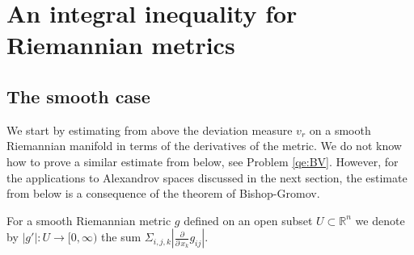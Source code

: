 \documentclass[12pt,leqno,intlimits]{amsart}
\numberwithin{equation}{section}
\newtheorem{prop}[thm]{PROPOSITION}
\theoremstyle{definition}
\newtheorem{defn}[thm]{Definition}%
\theoremstyle{remark}
\newcommand{\R}{\mathbb{R}}
\def\:{\colon}
\begin{document}






\section{An integral inequality for Riemannian metrics}\label{sec-BV-estimate}
\subsection{The smooth case} We start by estimating from above the deviation measure $v_r$  on a smooth Riemannian manifold in terms of the
derivatives of the metric.  We do not know how to prove a similar estimate from below, see  Problem \ref{qe:BV}. However, for the applications
to Alexandrov spaces discussed in the next section, the  estimate from below is a consequence of the theorem of Bishop-Gromov.

For a smooth Riemannian metric $g$ defined on an open subset $U\subset \R^n$ we denote by $|g'|:U\to [0,\infty)$ the sum $\Sigma_{i,j,k}|\frac \partial {\partial \,x_k} g_{ij}|$.

\end{document}
